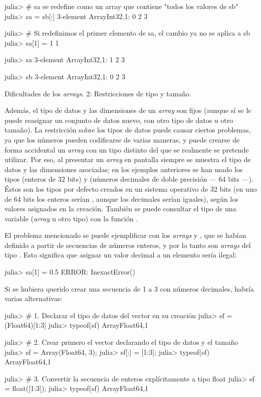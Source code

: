 ﻿\documentclass[spanish]{article}
\begin{document}
julia> # sa se redefine como un array que contiene "todos los valores de sb"
julia> sa = sb[:]
3-element Array{Int32,1}:
 0 2 3

julia> # Si redefinimos el primer elemento de sa, el cambio ya no se aplica a sb
julia> sa[1] = 1
1

julia> sa
3-element
Array{Int32,1}:
 1 2 3

julia> sb
3-element Array{Int32,1}:
 0 2 3

Dificultades de los \emph{arrays}. 2: Restricciones de tipo y tamaño.

Además, el tipo de datos y las dimensiones de un \emph{array} son fijos (aunque sí se le puede reasignar un conjunto de datos nuevo, con otro tipo de datos u otro tamaño). La restricción sobre los tipos de datos puede causar ciertos problemas, ya que los números pueden codificarse de varias maneras, y puede crearse de forma accidental un \emph{array} con un tipo distinto del que se realmente se pretende utilizar. Por eso, al presentar un \emph{array} en pantalla siempre se muestra el tipo de datos y las dimensiones asociadas; en los ejemplos anteriores se han usado los tipos  (enteros de 32 bits) y  (números decimales de doble precisión --- 64 bits ---). Éstos son los tipos por defecto creados en un sistema operativo de 32 bits (en uno de 64 bits los enteros serían , aunque los decimales serían iguales), según los valores asignados en la creación. También se puede consultar el tipo de una variable (\emph{array} u otro tipo) con la función .

El problema mencionado se puede ejemplificar con los \emph{arrays}  y , que se habían definido a partir de secuencias de números enteros, y por lo tanto son \emph{arrays} del tipo . Esto significa que asignar un valor decimal a un elemento sería ilegal:

julia> sa[1] = 0.5
ERROR: InexactError()

Si se hubiera querido crear una secuencia de 1 a 3 con números decimales, habría varias alternativas:

julia> # 1. Declarar el tipo de datos del vector en su creación
julia> sf = (Float64)[1:3]
julia> typeof(sf)
Array{Float64,1}

julia> # 2. Crear primero el vector declarando el tipo de datos y el tamaño
julia> sf = Array(Float64, 3);
julia> sf[:] = [1:3];
julia> typeof(sf)
Array{Float64,1}

julia> # 3. Convertir la secuencia de enteros explícitamente a tipo float
julia> sf = float([1:3]);
julia> typeof(sf)
Array{Float64,1}
\end{document}
